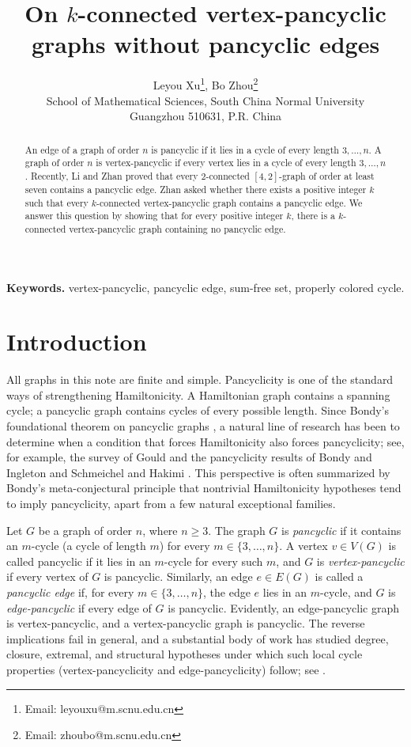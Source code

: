 \documentclass[12pt]{article}
\title{On $k$-connected vertex-pancyclic graphs without pancyclic edges}
\author{Leyou Xu\footnote{Email: leyouxu@m.scnu.edu.cn}, Bo Zhou\footnote{Email: zhoubo@m.scnu.edu.cn} \\
School of Mathematical Sciences, South China Normal University\\
Guangzhou 510631, P.R. China}
\date{}
\begin{document}
\maketitle

\begin{abstract}
An edge of a  graph of order $n$  is  pancyclic if it lies in a cycle of every length $3,\ldots,n$. A graph of order $n$  is vertex-pancyclic if every vertex lies in a cycle of every length $3,\ldots,n$. 
Recently, Li and Zhan proved that  every $2$-connected $[4,2]$-graph 
of order at least seven   contains a pancyclic edge. Zhan asked whether there exists a positive integer $k$ such that every $k$-connected vertex-pancyclic graph contains a pancyclic edge. We answer this question by showing that 
for every positive integer $k$, there is a $k$-connected vertex-pancyclic graph containing no pancyclic edge.
\end{abstract}

\medskip
\noindent\textbf{Keywords.} vertex-pancyclic, pancyclic edge,  sum-free set, properly colored cycle.


\section{Introduction}

All graphs in this note are finite and simple. 
Pancyclicity is one of the standard ways of strengthening Hamiltonicity. A Hamiltonian graph contains a spanning cycle; a pancyclic graph contains cycles of every possible length. Since Bondy's foundational theorem on pancyclic graphs \cite{Bondy1971}, a natural line of research has been to determine 
when a condition that forces Hamiltonicity also forces pancyclicity; see, for example, the survey of Gould \cite{Gould2003} and the pancyclicity results of Bondy and Ingleton \cite{BondyIngleton1976} and Schmeichel and Hakimi \cite{SchmeichelHakimi1974}. This perspective is often summarized by Bondy's meta-conjectural principle that nontrivial Hamiltonicity hypotheses tend to imply pancyclicity, apart from a few natural exceptional families.


Let $G$ be a graph of order $n$, where $n\ge 3$. The graph $G$  is \emph{pancyclic} if it contains an $m$-cycle (a cycle of length $m$) for every $m\in\{3,\ldots,n\}$. A vertex $v\in V(G)$ is called pancyclic if it lies in an $m$-cycle for every such $m$, and $G$ is \emph{vertex-pancyclic} if every vertex of $G$ is pancyclic. Similarly, an edge $e\in E(G)$ is called a \emph{pancyclic edge} if, for every $m\in\{3,\ldots,n\}$, the edge $e$ lies in an $m$-cycle, and $G$ is  \emph{edge-pancyclic} if
every edge of $G$ is pancyclic.
Evidently,  an edge-pancyclic graph is vertex-pancyclic, and a  vertex-pancyclic graph is pancyclic. The reverse implications fail in general, and a substantial body of work has studied degree, closure, extremal, and structural hypotheses under which such local cycle properties (vertex-pancyclicity and edge-pancyclicity) follow; see \cite{Broersma1997,CreamGouldHirohata2018,Hendry1990,Hobbs1976,Randerath2002,ZhangHolton1993}.
\end{document}
